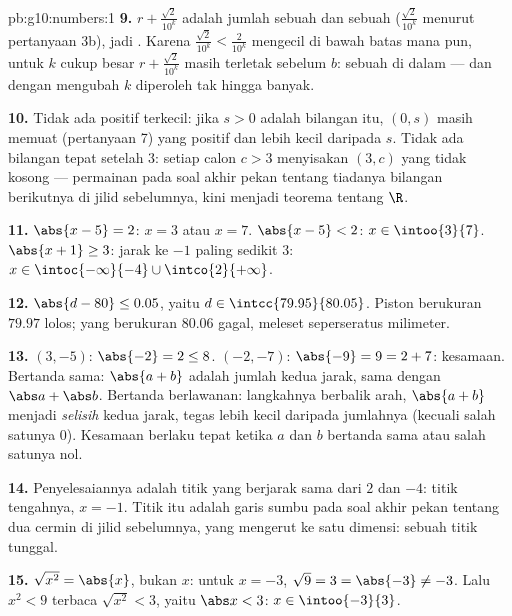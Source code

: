 \begin{solution}{pb:g10:numbers:1}
\textbf{9.} $r + \frac{\sqrt2}{10^k}$ adalah jumlah sebuah  dan sebuah  ($\frac{\sqrt2}{10^k}$ 
menurut pertanyaan 3b), jadi . Karena
$\frac{\sqrt2}{10^k} < \frac{2}{10^k}$ mengecil di bawah batas mana pun,
untuk $k$ cukup besar $r + \frac{\sqrt2}{10^k}$ masih terletak
sebelum $b$: sebuah  di dalam  --- dan dengan
mengubah $k$ diperoleh tak hingga banyak.

\textbf{10.} Tidak ada  positif terkecil: jika $s > 0$
adalah bilangan itu,  $(0, s)$ masih memuat 
(pertanyaan 7) yang positif dan lebih kecil daripada $s$. Tidak ada
bilangan tepat setelah $3$: setiap calon $c > 3$ menyisakan 
$(3, c)$ yang tidak kosong --- permainan pada soal akhir pekan tentang
tiadanya bilangan berikutnya di jilid sebelumnya, kini menjadi teorema
tentang $\R$.

\textbf{11.} $\abs{x - 5} = 2$: $x = 3$ atau $x = 7$.
$\abs{x - 5} < 2$: $x \in \intoo{3}{7}$.
$\abs{x + 1} \geq 3$: jarak ke $-1$ paling sedikit $3$:
$x \in \intoc{-\infty}{-4} \cup \intco{2}{+\infty}$.

\textbf{12.} $\abs{d - 80} \leq 0.05$, yaitu
$d \in \intcc{79.95}{80.05}$. Piston berukuran $79.97$ lolos;
yang berukuran $80.06$ gagal, meleset seperseratus milimeter.

\textbf{13.} $(3, -5)$: $\abs{-2} = 2 \leq 8$. $(-2, -7)$:
$\abs{-9} = 9 = 2 + 7$: kesamaan. Bertanda sama: $\abs{a + b}$ adalah
jumlah kedua jarak, sama dengan $\abs a + \abs b$. Bertanda berlawanan:
langkahnya berbalik arah, $\abs{a + b}$ menjadi
\emph{selisih} kedua jarak, tegas lebih kecil daripada
jumlahnya (kecuali salah satunya $0$). Kesamaan berlaku tepat ketika $a$
dan $b$ bertanda sama atau salah satunya nol.

\textbf{14.} Penyelesaiannya adalah titik yang berjarak sama dari $2$
dan $-4$: titik tengahnya, $x = -1$. Titik itu adalah garis sumbu pada
soal akhir pekan tentang dua cermin di jilid sebelumnya, yang mengerut
ke satu dimensi: sebuah titik tunggal.

\textbf{15.} $\sqrt{x^2} = \abs{x}$, bukan $x$: untuk $x = -3$,
$\sqrt{9} = 3 = \abs{-3} \neq -3$. Lalu $x^2 < 9$ terbaca
$\sqrt{x^2} < 3$, yaitu $\abs x < 3$:
$x \in \intoo{-3}{3}$.


\end{solution}
